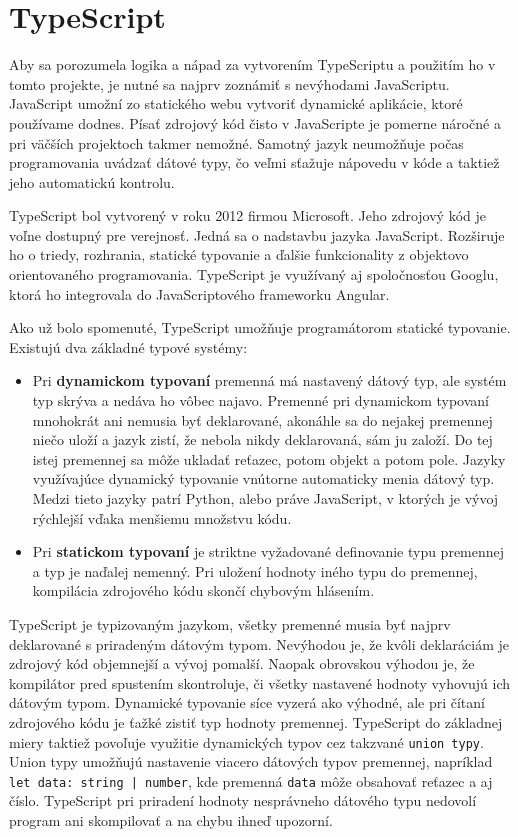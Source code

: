 \section{TypeScript}
\label{typescript}
Aby sa porozumela logika a nápad za vytvorením TypeScriptu a použitím ho v tomto projekte, je nutné sa najprv zoznámiť s nevýhodami JavaScriptu. JavaScript\cite{typescript} umožní zo statického webu vytvoriť dynamické aplikácie, ktoré používame dodnes. Písať zdrojový kód čisto v JavaScripte je pomerne náročné a pri väčších projektoch takmer nemožné. Samotný jazyk neumožňuje počas programovania uvádzať dátové typy, čo veľmi sťažuje nápovedu v kóde a taktiež jeho automatickú kontrolu.

TypeScript\cite{typescript} bol vytvorený v roku 2012 firmou Microsoft. Jeho zdrojový kód je voľne dostupný pre verejnosť. Jedná sa o nadstavbu jazyka JavaScript. Rozširuje ho o triedy, rozhrania, statické typovanie a ďalšie funkcionality z objektovo orientovaného programovania. TypeScript je využívaný aj spoločnosťou Googlu, ktorá ho integrovala do JavaScriptového frameworku Angular.

Ako už bolo spomenuté, TypeScript umožňuje programátorom statické typovanie. Existujú dva základné typové systémy:
    \begin{itemize}
        \item Pri \textbf{dynamickom typovaní} premenná má nastavený dátový typ, ale systém typ skrýva a nedáva ho vôbec najavo. Premenné pri dynamickom typovaní mnohokrát ani nemusia byť deklarované, akonáhle sa do nejakej premennej niečo uloží a jazyk zistí, že nebola nikdy deklarovaná, sám ju založí. Do tej istej premennej sa môže ukladať reťazec, potom objekt a potom pole. Jazyky využívajúce dynamický typovanie vnútorne automaticky menia dátový typ. Medzi tieto jazyky patrí Python, alebo práve JavaScript, v ktorých je vývoj rýchlejší vďaka menšiemu množstvu kódu.
        \item Pri \textbf{statickom typovaní} je striktne vyžadované definovanie typu premennej a typ je naďalej nemenný. Pri uložení hodnoty iného typu do premennej, kompilácia zdrojového kódu skončí chybovým hlásením.
    \end{itemize}
    
    TypeScript\cite{typescript} je typizovaným jazykom, všetky premenné musia byť najprv deklarované s priradeným dátovým typom. Nevýhodou je, že kvôli deklaráciám je zdrojový kód objemnejší a vývoj pomalší. Naopak obrovskou výhodou je, že kompilátor pred spustením skontroluje, či všetky nastavené hodnoty vyhovujú ich dátovým typom. Dynamické typovanie síce vyzerá ako výhodné, ale pri čítaní zdrojového kódu je ťažké zistiť typ hodnoty premennej. TypeScript do základnej miery taktiež povoľuje využitie dynamických typov cez takzvané \texttt{union typy}. Union typy umožňujú nastavenie viacero dátových typov premennej, napríklad \texttt{let data: string | number}, kde premenná \texttt{data} môže obsahovať reťazec a aj číslo. TypeScript pri priradení hodnoty nesprávneho dátového typu nedovolí program ani skompilovať a na chybu ihneď upozorní.
    
